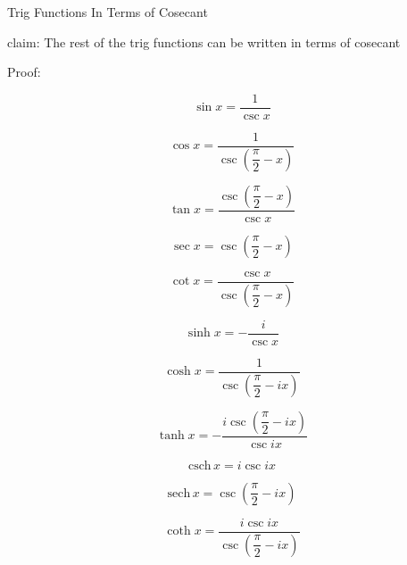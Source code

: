 \documentclass[12pt]{article}
\begin{document}
\pagebreak
\begin{section}{Trig Functions In Terms of Cosecant}
	
	\noindent claim: The rest of the trig functions can be written in terms of cosecant

	\noindent Proof:

	\begin{equation}\sin x=\dfrac1{\csc x}\end{equation}

	\begin{equation}\cos x=\dfrac1{\csc\left(\dfrac\pi2-x\right)}\end{equation}

	\begin{equation}\tan x=\dfrac{\csc\left(\dfrac\pi2-x\right)}{\csc x}\end{equation}

	
	\begin{equation}\sec x=\csc\left(\dfrac\pi2-x\right)\end{equation}

	\begin{equation}\cot x=\dfrac{\csc x}{\csc\left(\dfrac\pi2-x\right)}\end{equation}


	\begin{equation}\sinh x=-\dfrac i{\csc x}\end{equation}

	\begin{equation}\cosh x=\dfrac1{\csc\left(\dfrac\pi2-ix\right)}\end{equation}

	\begin{equation}\tanh x=-\dfrac{i\csc\left(\dfrac\pi2-ix\right)}{\csc ix}\end{equation}

	\begin{equation}\text{csch}\,x=i\csc ix\end{equation}

	\begin{equation}\text{sech}\,x=\csc\left(\dfrac\pi2-ix\right)\end{equation}

	\begin{equation}\coth x=\dfrac{i\csc ix}{\csc\left(\dfrac\pi2-ix\right)}\end{equation}

	\noindent\blacksquare
\end{section}
\end{document}
